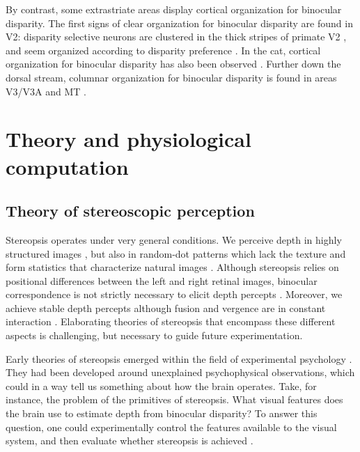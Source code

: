 By contrast, some extrastriate areas display cortical organization for binocular disparity. The first signs of clear organization for binocular disparity are found in V2: disparity selective neurons are clustered in the thick stripes of primate V2 \cite{Hubel:1987ly}, and seem organized according to disparity preference \cite{Hubel:1970dq, Chen:2008vn}. In the cat, cortical organization for binocular disparity has also been observed \cite{Kara:2009fk}. Further down the dorsal stream, columnar organization for binocular disparity is found in areas V3/V3A \cite{Adams:2001wt, Anzai:2011gb, Yeagle_Lafer-Sousa_Conway_2013} and MT \cite{DeAngelis:1999fk}.
 
\section{Theory and physiological computation} 

\subsection{Theory of stereoscopic perception}


Stereopsis operates under very general conditions. We perceive depth in highly structured images \cite{Wheatstone:1838xf}, but also in random-dot patterns which lack the texture and form statistics that characterize natural images \cite{BLTJ:BLTJ3954}. Although stereopsis relies on positional differences between the left and right retinal images, binocular correspondence is not strictly necessary to elicit depth percepts \cite{KAUFMAN:1965vn,Mayhew:1976ys,Kaye:1978os,Nakayama:1990fc}. Moreover, we achieve stable depth percepts although fusion and vergence are in constant interaction \cite{Sperling:1970ys,Masson:1997jq}. Elaborating theories of stereopsis that encompass these different aspects is challenging, but necessary to guide future experimentation.

Early theories of stereopsis emerged within the field of experimental psychology \cite{hering1977theory,koffka1935principles,Boring:1942bs,ogle1950researches,woodworth1954experimental}. They had been developed around unexplained psychophysical observations, which could in a way tell us something about how the brain operates. Take, for instance, the problem of the primitives of stereopsis. What visual features does the brain use to estimate depth from binocular disparity? To answer this question, one could experimentally control the features available to the visual system, and then evaluate whether stereopsis is achieved \cite{KAUFMAN:1965vn,KAUFMAN:1964kx,Mayhew:1976ys}.

